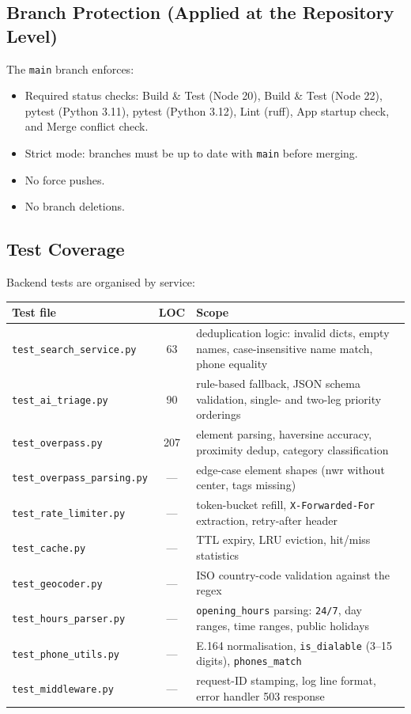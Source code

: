 \documentclass[11pt, a4paper]{article}
\newcommand{\code}[1]{\texttt{\small#1}}
\begin{document}
\subsection{Branch Protection (Applied at the Repository Level)}

The \code{main} branch enforces:

\begin{itemize}[leftmargin=*, itemsep=2pt, topsep=2pt]
  \item Required status checks: Build \& Test (Node 20), Build \& Test (Node 22), pytest (Python 3.11), pytest (Python 3.12), Lint (ruff), App startup check, and Merge conflict check.
  \item Strict mode: branches must be up to date with \code{main} before merging.
  \item No force pushes.
  \item No branch deletions.
\end{itemize}

\subsection{Test Coverage}

Backend tests are organised by service:

\begin{tabularx}{\textwidth}{l c X}
\toprule
\textbf{Test file} & \textbf{LOC} & \textbf{Scope} \\
\midrule
\code{test\_search\_service.py} & 63 & deduplication logic: invalid dicts, empty names, case-insensitive name match, phone equality \\
\code{test\_ai\_triage.py} & 90 & rule-based fallback, JSON schema validation, single- and two-leg priority orderings \\
\code{test\_overpass.py} & 207 & element parsing, haversine accuracy, proximity dedup, category classification \\
\code{test\_overpass\_parsing.py} & --- & edge-case element shapes (nwr without center, tags missing) \\
\code{test\_rate\_limiter.py} & --- & token-bucket refill, \code{X-Forwarded-For} extraction, retry-after header \\
\code{test\_cache.py} & --- & TTL expiry, LRU eviction, hit/miss statistics \\
\code{test\_geocoder.py} & --- & ISO country-code validation against the regex \\
\code{test\_hours\_parser.py} & --- & \code{opening\_hours} parsing: \code{24/7}, day ranges, time ranges, public holidays \\
\code{test\_phone\_utils.py} & --- & E.164 normalisation, \code{is\_dialable} (3--15 digits), \code{phones\_match} \\
\code{test\_middleware.py} & --- & request-ID stamping, log line format, error handler 503 response \\
\bottomrule
\end{tabularx}
\end{document}
